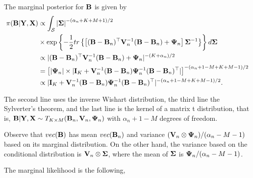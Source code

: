 The marginal posterior for ${\bf{B}}$ is given by
\begin{align*}
	\pi({\bf{B}}|{\bf{Y}},{\bf{X}})&\propto \int_{\bf{\mathcal{S}}} \left|{\bf \Sigma} \right|^{-(\alpha_n+K+M+1)/2}\\
	&\times\exp\left\lbrace -\frac{1}{2} tr\left\{\left[({\bf{B}}-{\bf{B}}_n)^{\top}{\bf{V}}_n^{-1}({\bf{B}}-{\bf{B}}_n)+{\bf{\Psi}}_n \right]  {\bf \Sigma}^{-1}\right\}\right\rbrace d{\bf{\Sigma}} \\
 	&\propto|({\bf{B}}-{\bf{B}}_n)^{\top}{\bf{V}}_n^{-1}({\bf{B}}-{\bf{B}}_n)+{\bf{\Psi}}_n|^{-(K+\alpha_n)/2}\\
 	&=\left[|{\bf{\Psi}}_n|\times|{\bf{I}}_K+{\bf{V}}_n^{-1}({\bf{B}}-{\bf{B}}_n){\bf{\Psi}}_n^{-1}({\bf{B}}-{\bf{B}}_n)^{\top}|\right]^{-(\alpha_n+1-M+K+M-1)/2}\\
 	&\propto|{\bf{I}}_K+{\bf{V}}_n^{-1}({\bf{B}}-{\bf{B}}_n){\bf{\Psi}}_n^{-1}({\bf{B}}-{\bf{B}}_n)^{\top}|^{-(\alpha_n+1-M+K+M-1)/2}.
\end{align*}

The second line uses the inverse Wishart distribution, the third line the Sylverter's theorem, and the last line is the kernel of a matrix t distribution, that is, ${\bf{B}}|{\bf{Y}},{\bf{X}}\sim T_{K\times M}({\bf{B}}_n,{\bf{V}}_n,{\bf{\Psi}}_n)$ with $\alpha_n+1-M$ degrees of freedom. 

Observe that $vec({\bf{B}})$ has mean $vec({\bf{B}}_n)$ and variance $({\bf{V}}_n\otimes{\bf{\Psi}}_n)/(\alpha_n-M-1)$ based on its marginal distribution. On the other hand, the variance based on the conditional distribution is ${\bf{V}}_n\otimes{\bf{\Sigma}}$, where the mean of ${\bf{\Sigma}}$ is ${\bf{\Psi}}_n/(\alpha_n-M-1)$.   

The marginal likelihood is the following,

